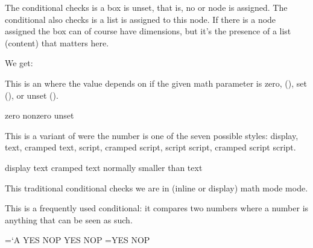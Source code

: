 \stopnewprimitive

\startnewprimitive[title={\prm {iflist}}]

The  conditional checks is a box is unset, that is, no 
or  node is assigned. The  conditional also checks is a
list is assigned to this node. If there is a node assigned the box can of course
have dimensions, but it's the presence of a list (content) that matters here.

\stopbuffer

\typebuffer

We get: \inlinebuffer

\stopnewprimitive

\startnewprimitive[title={\prm {ifmathparameter}}]

This is an  where the value depends on if the given math parameter
is zero, (), set (), or unset ().

\starttyping
\ifmathparameter\Umathpunctclosespacing\displaystyle
    zero    \or
    nonzero \or
    unset   \fi
\stoptyping

\stopnewprimitive

\startnewprimitive[title={\prm {ifmathstyle}}]

This is a variant of  were the number is one of the seven possible
styles: display, text, cramped text, script, cramped script, script script,
cramped script script.

\starttyping
\ifmathstyle
  display
\or
  text
\or
  cramped text
\else
  normally smaller than text
\fi
\stoptyping

\stopnewprimitive

\startoldprimitive[title={\prm {ifmmode}}]

This traditional conditional checks we are in (inline or display) math mode mode.

\stopoldprimitive

\startoldprimitive[title={\prm {ifnum}}]

This is a frequently used conditional: it compares two numbers where a number is
anything that can be seen as such.

\startbuffer
{} \chardef{}

=`A              YES \else NOP\fi
\ifnum{} YES \else NOP\fi
\ifnum\scratchcounter=\A YES \else NOP\fi
\stopbuffer

